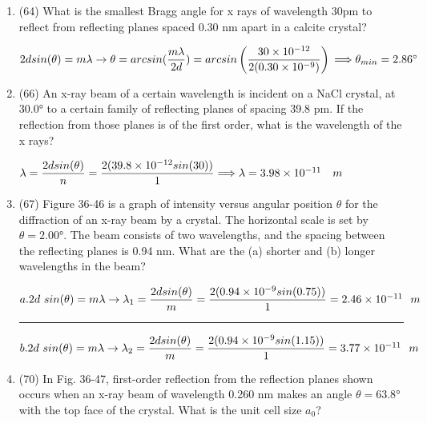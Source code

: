 \documentclass[fleqn]{article}
\begin{document}
  \begin{enumerate}
    \item (64) What is the smallest Bragg angle for x rays of wavelength 30pm to reflect from reflecting planes spaced 0.30 nm apart in a calcite crystal?

      \textcolor{hwColor}{ 
        $ 
          2dsin(\theta)=m \lambda \rightarrow \theta=arcsin(\dfrac{m \lambda}{2d})=arcsin\left(\dfrac{30 \times 10^{-12}}{2(0.30 \times 10^{-9})}\right) \\
          \Longrightarrow \theta_{min}=2.86^\circ
        $ 
      }

    \item (66) An x-ray beam of a certain wavelength is incident on a NaCl crystal, at 30.0° to a certain family of reflecting planes of spacing 39.8 pm. If the reflection from those planes is of the first order, what is the wavelength of the x rays?

      \textcolor{hwColor}{ 
        $ 
          \lambda=\dfrac{2dsin(\theta)}{n}=\dfrac{2(39.8 \times 10^{-12} sin(30))}{1} \\
          \Longrightarrow \lambda=3.98 \times 10^{-11} ~~~ m
        $ 
      }

    \item (67) Figure 36-46 is a graph of intensity versus angular position $\theta$ for the diffraction of an x-ray beam by a crystal. The horizontal scale is set by $\theta=2.00°$. The beam consists of two wavelengths, and the spacing between the reflecting planes is 0.94 nm. What are the (a) shorter and (b) longer wavelengths in the beam?

    \textcolor{hwColor}{ 
      $ 
        a. \\ 
        2d~sin(\theta)=m \lambda \rightarrow \lambda_1=\dfrac{2dsin(\theta)}{m}=\dfrac{2(0.94 \times 10^{-9}sin(0.75))}{1}=2.46 \times 10^{-11} ~~ m
      $ 
    }

    \textcolor{hwColor}{   
      \rule{15cm}{0.4pt}   
    } 

    \textcolor{hwColor}{ 
      $ 
        b. \\ 
        2d~sin(\theta)=m \lambda \rightarrow \lambda_2=\dfrac{2dsin(\theta)}{m}=\dfrac{2(0.94 \times 10^{-9}sin(1.15))}{1}=3.77 \times 10^{-11} ~~ m
      $ 
    }

    \item (70) In Fig. 36-47, first-order reflection from the reflection planes shown occurs when an x-ray beam of wavelength 0.260 nm makes an angle $\theta=63.8°$ with the top face of the crystal. What is the unit cell size $a_0$?


\end{enumerate}
\end{document}
